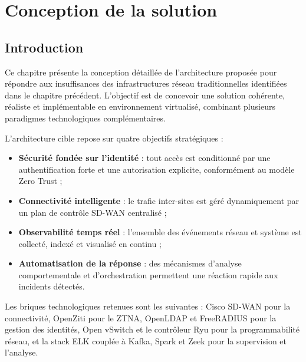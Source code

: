 \documentclass[12pt,a4paper,oneside]{report}
\begin{document}
	
	
	\newpage
	
	\chapter{Conception de la solution}
	

	\section*{Introduction}
	Ce chapitre présente la conception détaillée de l'architecture proposée pour
	répondre aux insuffisances des infrastructures réseau traditionnelles identifiées
	dans le chapitre précédent. L'objectif est de concevoir une solution cohérente,
	réaliste et implémentable en environnement virtualisé, combinant plusieurs
	paradigmes technologiques complémentaires.
	
	L'architecture cible repose sur quatre objectifs stratégiques :
	
	\begin{itemize}
		\item \textbf{Sécurité fondée sur l'identité} : tout accès est conditionné
		par une authentification forte et une autorisation explicite, conformément
		au modèle Zero Trust ;
		\item \textbf{Connectivité intelligente} : le trafic inter-sites est géré
		dynamiquement par un plan de contrôle SD-WAN centralisé ;
		\item \textbf{Observabilité temps réel} : l'ensemble des événements réseau
		et système est collecté, indexé et visualisé en continu ;
		\item \textbf{Automatisation de la réponse} : des mécanismes d'analyse
		comportementale et d'orchestration permettent une réaction rapide aux
		incidents détectés.
	\end{itemize}
	
	Les briques technologiques retenues sont les suivantes : Cisco SD-WAN pour la
	connectivité, OpenZiti pour le ZTNA, OpenLDAP et FreeRADIUS pour la gestion
	des identités, Open vSwitch et le contrôleur Ryu pour la programmabilité réseau,
	et la stack ELK couplée à Kafka, Spark et Zeek pour la supervision et l'analyse.
	
\end{document}
